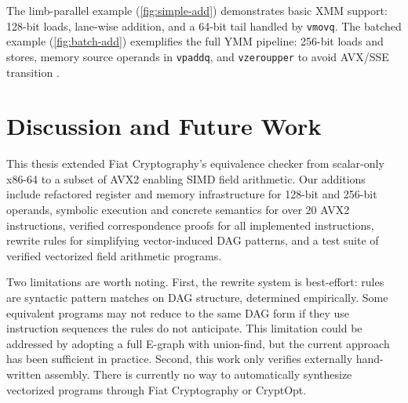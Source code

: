 


The limb-parallel example (\autoref{fig:simple-add}) demonstrates basic XMM support: 128-bit loads, lane-wise addition, and a 64-bit tail handled by \texttt{vmovq}. 
The batched example (\autoref{fig:batch-add}) exemplifies the full YMM pipeline: 256-bit loads and stores, memory source operands in \texttt{vpaddq}, and \texttt{vzeroupper} to avoid AVX/SSE transition .


\chapter{Discussion and Future Work}
\label{ch:discussion}

This thesis extended Fiat Cryptography's equivalence checker from scalar-only x86-64 to a subset of AVX2 enabling SIMD field arithmetic.
Our additions include refactored register and memory infrastructure for 128-bit and 256-bit operands, symbolic execution and concrete semantics for over 20 AVX2 instructions, verified correspondence proofs for all implemented instructions, rewrite rules for simplifying vector-induced DAG patterns, and a test suite of verified vectorized field arithmetic programs.

Two limitations are worth noting.
First, the rewrite system is best-effort: rules are syntactic pattern matches on DAG structure, determined empirically.
Some equivalent programs may not reduce to the same DAG form if they use instruction sequences the rules do not anticipate.
This limitation could be addressed by adopting a full E-graph with union-find, but the current approach has been sufficient in practice.
Second, this work only verifies externally hand-written assembly. There is currently no way to automatically synthesize vectorized programs through Fiat Cryptography or CryptOpt.


